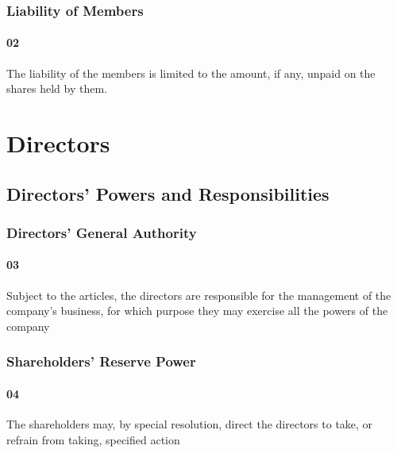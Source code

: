 \documentclass[letterpaper,10pt,english]{sphinxmanual}
\begin{document}
\subsection{Liability of Members}
\label{\detokenize{content:liability-of-members}}

\subsubsection{02}
\label{\detokenize{content:id2}}
The liability of the members is limited to the amount, if any, unpaid on the shares held by them.


\chapter{Directors}
\label{\detokenize{content:directors}}

\section{Directors’ Powers and Responsibilities}
\label{\detokenize{content:directors-powers-and-responsibilities}}

\subsection{Directors’ General Authority}
\label{\detokenize{content:directors-general-authority}}

\subsubsection{03}
\label{\detokenize{content:id3}}
Subject to the articles, the directors are responsible for the management of the company’s business, for which purpose they may exercise all the powers of the company


\subsection{Shareholders’ Reserve Power}
\label{\detokenize{content:shareholders-reserve-power}}

\subsubsection{04}
\label{\detokenize{content:id4}}
The shareholders may, by special resolution, direct the directors to take, or refrain from taking, specified action
\end{document}
